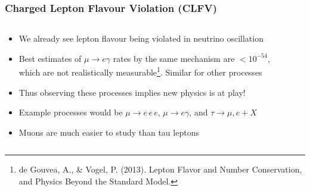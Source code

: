 \documentclass[11pt]{beamer}
\begin{document}
\begin{frame}
    \frametitle{Charged Lepton Flavour Violation (CLFV)}
    \begin{columns}[c]
        \begin{column}{0.6\textwidth}
            \begin{itemize}
                \item We already see lepton flavour being violated in neutrino oscillation
                \item Best estimates of $\mu \rightarrow e\gamma$ rates by the same mechanism are $<10^{-54}$, which are not realistically measurable\footnote[frame]{de Gouvea, A., \& Vogel, P. (2013). Lepton Flavor and Number Conservation, and Physics Beyond the Standard Model.}. Similar for other processes
                \item Thus observing these processes implies new physics is at play!
                \item Example processes would be $\mu\rightarrow e\,e\,e$, $\mu \rightarrow e\gamma$, and $\tau \rightarrow \mu,e + X$
                \item Muons are much easier to study than tau leptons
            \end{itemize}
        \end{column}

        \begin{column}{0.4\textwidth}
        \end{column}
    \end{columns}
\end{frame}
\end{document}
